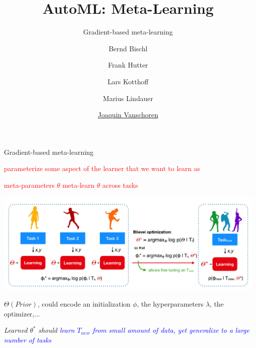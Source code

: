 
\usepackage{multimedia}

\title[Meta-Learning]{AutoML: Meta-Learning} 
\subtitle{Gradient-based meta-learning}
\author[Joaquin Vanschoren]{Bernd Bischl \and Frank Hutter \and Lars Kotthoff\newline \and Marius Lindauer \and \underline{Joaquin Vanschoren}}
\institute{}
\date{}


\maketitle

\begin{frame}{Gradient-based meta-learning}

    \centerline{\textcolor{red}{parameterize some aspect of the learner that we want to learn as}} 
    \centerline{\textcolor{red}{meta-parameters $\theta$ meta-learn $\theta$ across tasks}}
    \centering\includegraphics[height=5cm]{image/img000908.jpg}
    \small\centerline{$\Theta(Prior)$, could encode an initialization $\phi$, the hyperparameters $\lambda$, the optimizer,...}
    \leavevmode\hphantom{ }

    \small\centerline{\textit{Learned $\theta^*$ should \textcolor{blue}{learn $T_{new}$ from small amount of data, yet generalize to a large number of tasks}}}
\end{frame}

